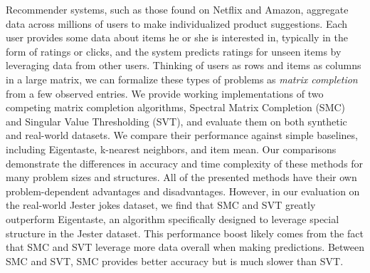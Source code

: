 Recommender systems, such as those found on Netflix and Amazon,
aggregate data across millions of users to make individualized product
suggestions. Each user provides some data about items he or she is
interested in, typically in the form of ratings or clicks, and the
system predicts ratings for unseen items by leveraging data from other
users. Thinking of users as rows and items as columns in a large
matrix, we can formalize these types of problems as \emph{matrix
completion} from a few observed entries. We provide working
implementations of two competing matrix completion algorithms,
Spectral Matrix Completion (SMC) and Singular Value Thresholding
(SVT), and evaluate them on both synthetic and real-world datasets. We
compare their performance against simple baselines, including
Eigentaste, k-nearest neighbors, and item mean. Our comparisons
demonstrate the differences in accuracy and time complexity of these
methods for many problem sizes and structures. All of the presented
methods have their own problem-dependent advantages and disadvantages.
However, in our evaluation on the real-world Jester jokes dataset, we
find that SMC and SVT greatly outperform Eigentaste, an algorithm
specifically designed to leverage special structure in the Jester
dataset. This performance boost likely comes from the fact that SMC
and SVT leverage more data overall when making predictions. Between
SMC and SVT, SMC provides better accuracy but is much slower than SVT.
